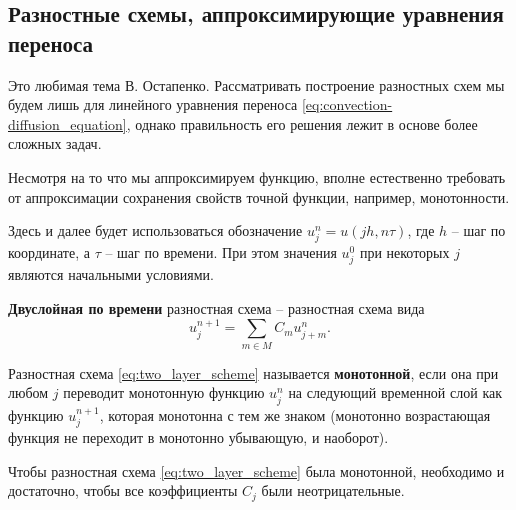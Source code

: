 \documentclass{article}
\begin{document}
\subsection{Разностные схемы, аппроксимирующие уравнения переноса}
Это любимая тема В. Остапенко. Рассматривать построение разностных схем
мы будем лишь для линейного уравнения переноса
\eqref{eq:convection-diffusion_equation}, однако правильность его решения лежит
в основе более сложных задач.

Несмотря на то что мы аппроксимируем функцию, вполне естественно требовать от
аппроксимации сохранения свойств точной функции, например, монотонности.

Здесь и далее будет использоваться обозначение $u_j^n=u(jh,n\tau)$, где $h$ --
шаг по координате, а $\tau$ -- шаг по времени. При этом значения $u^0_j$ при
некоторых $j$ являются начальными условиями.

\begin{define}\label{eq:two_layer_scheme}
	\textbf{Двуслойная по времени} разностная схема -- разностная схема вида
	\[u_j^{n+1}=\sum_{m\in M}C_mu_{j+m}^n.\]
\end{define}

\begin{define}\label{eq:monotonic_scheme}
	Разностная схема \eqref{eq:two_layer_scheme} называется
	\textbf{монотонной}, если она при любом $j$ переводит монотонную функцию
	$u_j^n$ на следующий временной слой как функцию $u_j^{n+1}$, которая
	монотонна с тем же знаком (монотонно возрастающая функция не переходит в
	монотонно убывающую, и наоборот).
\end{define}

\begin{theorem}
\label{eq:monotonic_scheme_criterion}
	Чтобы разностная схема \eqref{eq:two_layer_scheme} была монотонной,
	необходимо и достаточно, чтобы все коэффициенты $C_j$ были
	неотрицательные.
\end{theorem}
\end{document}
